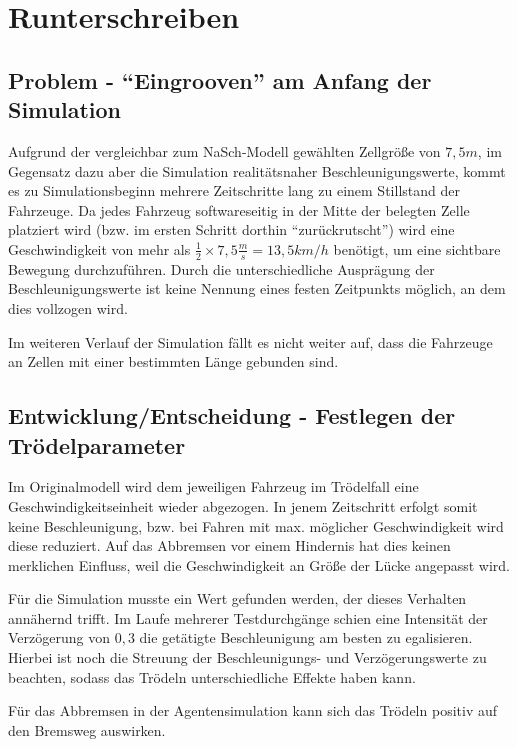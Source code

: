 \section{Runterschreiben}
\label{sec:rusch}



\subsection{Problem - \enquote{Eingrooven} am Anfang der Simulation}

Aufgrund der vergleichbar zum NaSch-Modell gewählten Zellgröße von $7,5 m$, im Gegensatz dazu aber die Simulation realitätsnaher Beschleunigungswerte, kommt es zu Simulationsbeginn mehrere Zeitschritte lang zu einem Stillstand der Fahrzeuge.
Da jedes Fahrzeug softwareseitig in der Mitte der belegten Zelle platziert wird (bzw. im ersten Schritt dorthin \enquote{zurückrutscht}) wird eine Geschwindigkeit von mehr als $ \frac{1}{2} \times 7,5 \frac{m}{s} = 13,5 km/h$ benötigt, um eine sichtbare Bewegung durchzuführen.
Durch die unterschiedliche Ausprägung der Beschleunigungswerte ist keine Nennung eines festen Zeitpunkts möglich, an dem dies vollzogen wird.

Im weiteren Verlauf der Simulation fällt es nicht weiter auf, dass die Fahrzeuge an Zellen mit einer bestimmten Länge gebunden sind.



\subsection{Entwicklung/Entscheidung - Festlegen der Trödelparameter}

Im Originalmodell wird dem jeweiligen Fahrzeug im Trödelfall eine Geschwindigkeitseinheit wieder abgezogen. 
In jenem Zeitschritt erfolgt somit keine Beschleunigung, bzw. bei Fahren mit max. möglicher Geschwindigkeit wird diese reduziert. 
Auf das Abbremsen vor einem Hindernis hat dies keinen merklichen Einfluss, weil die Geschwindigkeit an Größe der Lücke angepasst wird.

Für die Simulation musste ein Wert gefunden werden, der dieses Verhalten annähernd trifft.
Im Laufe mehrerer Testdurchgänge schien eine Intensität der Verzögerung von $0,3$ die getätigte Beschleunigung am besten zu egalisieren. 
Hierbei ist noch die Streuung der Beschleunigungs- und Verzögerungswerte zu beachten, sodass das Trödeln unterschiedliche Effekte haben kann.

Für das Abbremsen in der Agentensimulation kann sich das Trödeln positiv auf den Bremsweg auswirken.



